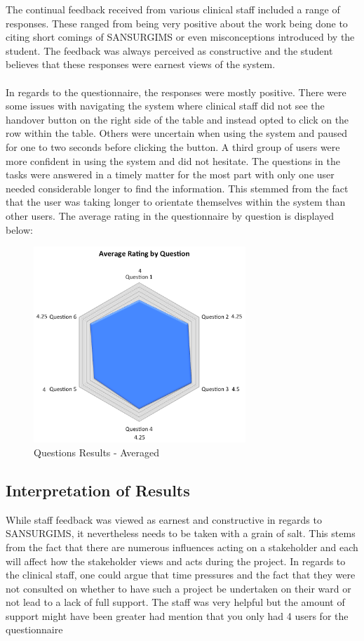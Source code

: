 The continual feedback received from various clinical staff included a range of responses. These ranged from being very positive about the work being done to citing short comings of SANSURGIMS or even misconceptions introduced by the student. The feedback was always perceived as constructive and the student believes that these responses were earnest views of the system. 
\\ \\
In regards to the questionnaire, the responses were mostly positive. There were some issues with navigating the system where clinical staff did not see the handover button on the right side of the table and instead opted to click on the row within the table. Others were uncertain when using the system and paused for one to two seconds before clicking the button. A third group of users were more confident in using the system and did not hesitate. The questions in the tasks were answered in a timely matter for the most part with only one user needed considerable longer to find the information. This stemmed from the fact that the user was taking longer to orientate themselves within the system than other users. The average rating in the questionnaire by question is displayed below:

\begin{figure}[hp]
				\centering
				\includegraphics[scale=1.0, width=80mm]{Images/Evaluation-Results}
				\caption{Questions Results - Averaged}
\end{figure}

\newpage
\subsection{Interpretation of Results}
While staff feedback was viewed as earnest and constructive in regards to SANSURGIMS, it nevertheless needs to be taken with a grain of salt. This stems from the fact that there are numerous influences acting on a stakeholder and each will affect how the stakeholder views and acts during the project. In regards to the clinical staff, one could argue that time pressures and the fact that they were not consulted on whether to have such a project be undertaken on their ward or not lead to a lack of full support. The staff was very helpful but the amount of support might have been greater had 
mention that you only had 4 users for the questionnaire

